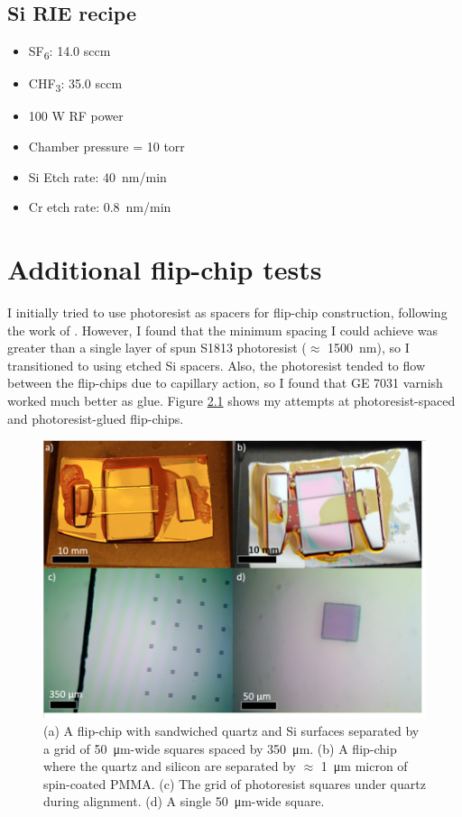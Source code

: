 \documentclass[double,12pt,1in]{beavtex}
\begin{document}
\section{Si RIE recipe}\label{Si RIE recipe}

\begin{itemize}
    \item SF\textsubscript{6}: 14.0 sccm
    \item CHF\textsubscript{3}: 35.0 sccm
    \item 100 W RF power
    \item Chamber pressure = 10 torr
    \item Si Etch rate: \SI{40}{\nano\meter/\minute}
    \item Cr etch rate: \SI{0.8}{\nano\meter/\minute}

\end{itemize}



\chapter{Additional flip-chip tests} \label{additional flip-chip tests}
I initially tried to use photoresist as spacers for flip-chip construction, following the work of \cite{bennaceur_mechanical_2015}. However, I found that the minimum spacing I could achieve was greater than a single layer of spun S1813 photoresist ($\approx$ \SI{1500}{\nano\meter}), so I transitioned to using etched Si spacers. Also, the photoresist tended to flow between the flip-chips due to capillary action, so I found that GE 7031 varnish worked much better as glue. Figure \ref{PRFC} shows my attempts at photoresist-spaced and photoresist-glued flip-chips.


\begin{figure}
    \includegraphics[width = 1\textwidth]{photoresist flip-chips.png}
    \caption{(a) A flip-chip with sandwiched quartz and Si surfaces separated by a grid of \SI{50}{\micro\meter}-wide squares spaced by \SI{350}{\micro\meter}. (b) A flip-chip where the quartz and silicon are separated by $\approx$ \SI{1}{\micro\meter} micron of spin-coated PMMA. (c) The grid of photoresist squares under quartz during alignment. (d) A single \SI{50}{\micro\meter}-wide square.
    }
    \label{PRFC}
\end{figure}
\end{document}
